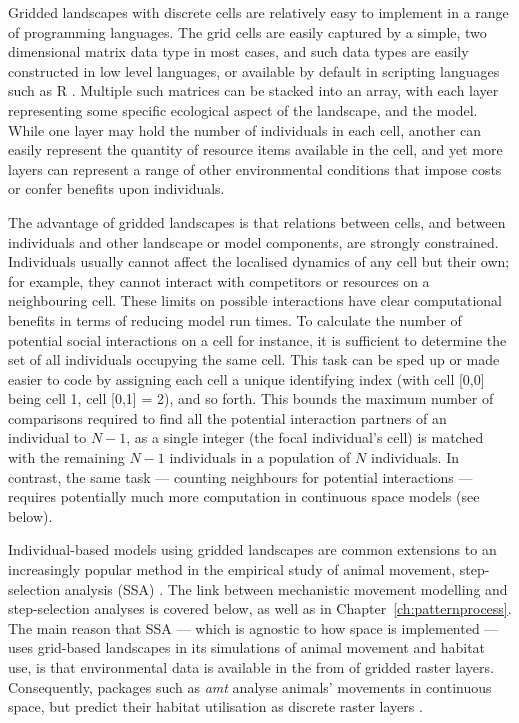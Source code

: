 Gridded landscapes with discrete cells are relatively easy to implement in a range of programming languages.
The grid cells are easily captured by a simple, two dimensional matrix data type in most cases, and such data types are easily constructed in low level languages, or available by default in scripting languages such as R \citep{rcoreteam2020}.
Multiple such matrices can be stacked into an array, with each layer representing some specific ecological aspect of the landscape, and the model.
While one layer may hold the number of individuals in each cell, another can easily represent the quantity of resource items available in the cell, and yet more layers can represent a range of other environmental conditions that impose costs or confer benefits upon individuals.

The advantage of gridded landscapes is that relations between cells, and between individuals and other landscape or model components, are strongly constrained.
Individuals usually cannot affect the localised dynamics of any cell but their own; for example, they cannot interact with competitors or resources on a neighbouring cell.
These limits on possible interactions have clear computational benefits in terms of reducing model run times.
To calculate the number of potential social interactions on a cell for instance, it is sufficient to determine the set of all individuals occupying the same cell.
This task can be sped up or made easier to code by assigning each cell a unique identifying index (with cell [0,0] being cell 1, cell [0,1] = 2), and so forth.
This bounds the maximum number of comparisons required to find all the potential interaction partners of an individual to $N - 1$, as a single integer (the focal individual's cell) is matched with the remaining $N - 1$ individuals in a population of $N$ individuals.
In contrast, the same task --- counting neighbours for potential interactions --- requires potentially much more computation in continuous space models (see below).

Individual-based models using gridded landscapes are common extensions to an increasingly popular method in the empirical study of animal movement, step-selection analysis (SSA) \citep{fortin2005,avgar2016,fieberg2021}.
The link between mechanistic movement modelling and step-selection analyses is covered below, as well as in Chapter~\ref{ch:patternprocess}.
The main reason that SSA --- which is agnostic to how space is implemented --- uses grid-based landscapes in its simulations of animal movement and habitat use, is that environmental data is available in the from of gridded raster layers.
Consequently, packages such as \emph{amt} analyse animals' movements in continuous space, but predict their habitat utilisation as discrete raster layers \citep{signer2017,signer2019}.

